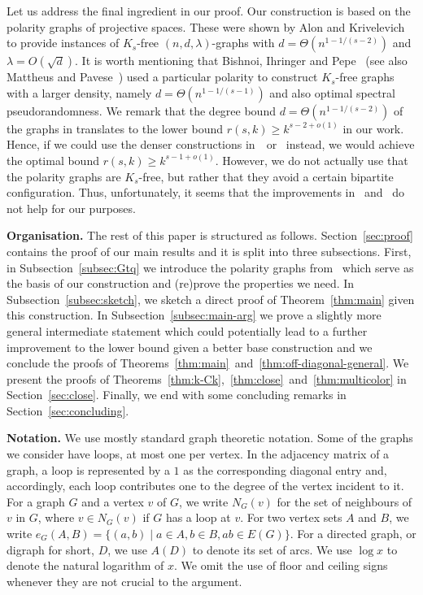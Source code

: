 \documentclass{article}
\theoremstyle{plain}
\theoremstyle{definition}
\begin{document}
Let us address the final ingredient in our proof. Our construction is based on the polarity graphs of projective spaces. These were shown by Alon and Krivelevich~\cite{alon-krivelevich} to provide instances of $K_s$-free $(n, d, \lambda)$-graphs with $d = \Theta(n^{1 - 1/(s-2)})$ and $\lambda = O(\sqrt{d})$. It is worth mentioning that Bishnoi, Ihringer and Pepe~\cite{bishnoiihringer} (see also Mattheus and Pavese~\cite{mattheus-pavese}) used a particular polarity to construct $K_s$-free graphs with a larger density, namely $d = \Theta(n^{1 - 1 / (s-1)})$ and also optimal spectral pseudorandomness. We remark that the degree bound $d = \Theta(n^{1-1/(s-2)})$ of the graphs in \cite{alon-krivelevich} translates to the lower bound $r(s, k) \ge k^{s-2+o(1)}$ in our work. Hence, if we could use the denser constructions in~\cite{bishnoiihringer}~or~\cite{mattheus-pavese} instead, we would achieve the optimal bound $r(s, k) \ge k^{s-1+o(1)}$. However, we do not actually use that the polarity graphs are $K_s$-free, but rather that they avoid a certain bipartite configuration. Thus, unfortunately, it seems that the improvements in~\cite{bishnoiihringer} and~\cite{mattheus-pavese} do not help for our purposes.

\textbf{Organisation.} The rest of this paper is structured as follows. Section~\ref{sec:proof} contains the proof of our main results and it is split into three subsections. First, in Subsection~\ref{subsec:Gtq} we introduce the polarity graphs from~\cite{alon-krivelevich} which serve as the basis of our construction and (re)prove the properties we need. In Subsection~\ref{subsec:sketch}, we sketch a direct proof of Theorem~\ref{thm:main} given this construction. In Subsection~\ref{subsec:main-arg} we prove a slightly more general intermediate statement which could potentially lead to a further improvement to the lower bound given a better base construction and we conclude the proofs of Theorems~\ref{thm:main}~and~\ref{thm:off-diagonal-general}. We present the proofs of Theorems~\ref{thm:k-Ck},~\ref{thm:close}~and~\ref{thm:multicolor} in Section~\ref{sec:close}. Finally, we end with some concluding remarks in Section~\ref{sec:concluding}.

\textbf{Notation.} We use mostly standard graph theoretic notation. Some of the graphs we consider have loops, at most one per vertex. In the adjacency matrix of a graph, a loop is represented by a $1$ as the corresponding diagonal entry and, accordingly, each loop contributes one to the degree of the vertex incident to it. For a graph $G$ and a vertex $v$ of $G$, we write $N_G(v)$ for the set of neighbours of $v$ in $G$, where $v \in N_G(v)$ if $G$ has a loop at $v$. For two vertex sets $A$ and $B$, we write $e_G(A, B) = \{ (a, b) \mid a \in A, b \in B, ab \in E(G) \}.$ For a directed graph, or digraph for short, $D$, we use $A(D)$ to denote its set of arcs. We use $\log x$ to denote the natural logarithm of $x$. We omit the use of floor and ceiling signs whenever they are not crucial to the argument.
\end{document}
